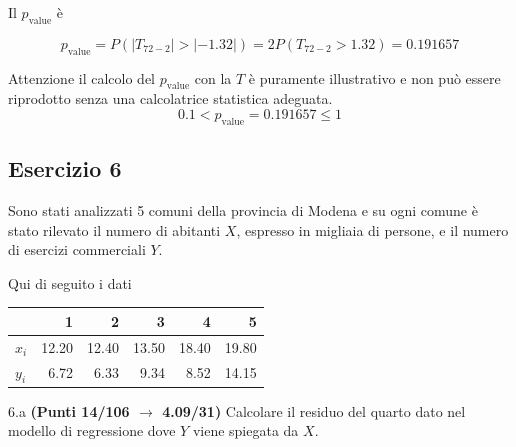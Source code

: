 \documentclass[
  11pt,
]{book}
\theoremstyle{mytheoremstyle}
\theoremstyle{mydefstyle}
\newenvironment{sol}
  {
  \begin{tcolorbox}[enhanced,breakable,arc=0.1mm,boxrule=1pt,colback=white,colframe=iblue,
  title=\bf \fontfamily{lmss}\selectfont \hspace{.5 cm} Soluzione,drop fuzzy shadow]

}{
\end{tcolorbox}
  }
\begin{document}
\begin{sol}
Il \(p_{\text{value}}\) è

\[ p_{\text{value}} = P(|T_{72-2}|>|-1.32|)=2P(T_{72-2}>1.32)=0.191657 \]

Attenzione il calcolo del \(p_\text{value}\) con la \(T\) è puramente illustrativo e non può essere riprodotto senza una calcolatrice statistica adeguata.\[
 0.1 < p_\text{value}= 0.191657 \leq 1 
\]

\end{sol}

\subsection{Esercizio 6}\label{esercizio-6-11}

Sono stati analizzati 5 comuni della provincia di Modena e su ogni comune è stato rilevato
il numero di abitanti \(X\), espresso in migliaia di persone, e il numero di esercizi commerciali \(Y\).

Qui di seguito i dati

\begin{table}[H]
\centering
\begin{tabular}{lrrrrr}
\toprule
  & 1 & 2 & 3 & 4 & 5\\
\midrule
$x_i$ & 12.20 & 12.40 & 13.50 & 18.40 & 19.80\\
$y_i$ & 6.72 & 6.33 & 9.34 & 8.52 & 14.15\\
\bottomrule
\end{tabular}
\end{table}

6.a \textbf{(Punti 14/106 \(\rightarrow\) 4.09/31)} Calcolare il residuo del quarto dato nel modello di regressione dove \(Y\) viene spiegata da \(X\).
\end{document}
